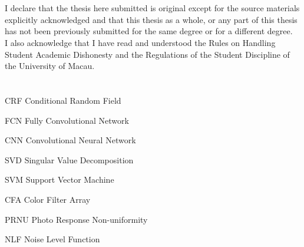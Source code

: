 \documentclass[a4paper, 12pt, twoside]{report}
\let\cleardoublepage=\clearpage
\begin{document}
\noindent
\lipsum[2] 

\chapter*{}
\lipsum[1]

\lipsum[2]

\lipsum[3]

\lipsum[4]

\chapter*{}
I declare that the thesis here submitted is original except for the source materials explicitly acknowledged and that this thesis as a whole, or any part of this thesis has not been previously submitted for the same degree or for a different degree.\\

\noindent
I also acknowledge that I have read and understood the Rules on Handling Student Academic Dishonesty and the Regulations of the Student Discipline of the University of Macau.

\newpage

\tableofcontents

\cleardoublepage
{}
\listoffigures
\newpage
\cleardoublepage
{}
\listoftables


\chapter*{}
\begin{abbrv}
\item[CRF]			Conditional Random Field
\item[FCN]          Fully Convolutional Network
\item[CNN]          Convolutional Neural Network
\item[SVD]          Singular Value Decomposition 
\item[SVM]          Support Vector Machine
\item[CFA]          Color Filter Array
\item[PRNU]         Photo Response Non-uniformity
\item[NLF]          Noise Level Function

\end{abbrv}
\end{document}
